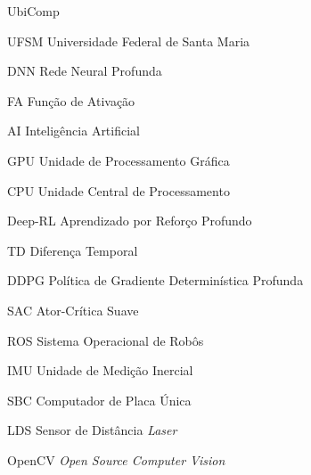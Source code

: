 \begin{listofabbrv}{UbiComp}
	

	  \item [UFSM]      Universidade Federal de Santa Maria
	  \item [DNN]       Rede Neural Profunda
	  \item [FA]        Função de Ativação
	  \item [AI]        Inteligência Artificial
	  \item [GPU]       Unidade de Processamento Gráfica
	  \item [CPU]       Unidade Central de Processamento
	  \item [Deep-RL]   Aprendizado por Reforço Profundo
	  \item [TD]        Diferença Temporal
	  \item [DDPG]      Política de Gradiente Determinística Profunda
	  \item [SAC]       Ator-Crítica Suave
	  \item [ROS]       Sistema Operacional de Robôs
	  \item [IMU]       Unidade de Medição Inercial
	  \item [SBC]       Computador de Placa Única
	  \item [LDS]       Sensor de Distância \textit{Laser}
	  \item [OpenCV]    \textit{Open Source Computer Vision}

\end{listofabbrv}